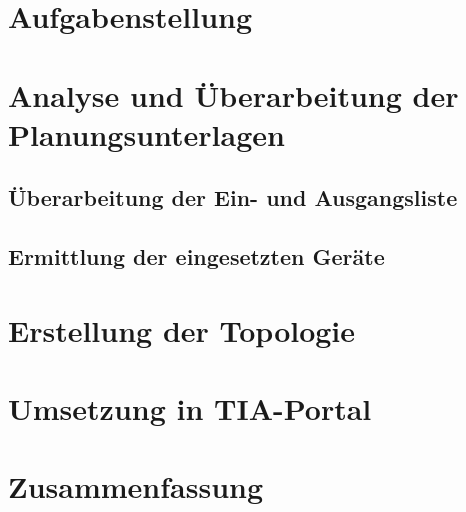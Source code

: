 \chapter{Aufgabenstellung}

\chapter{Analyse und Überarbeitung der Planungsunterlagen}

\section{Überarbeitung der Ein- und Ausgangsliste}

\section{Ermittlung der eingesetzten Geräte}

\chapter{Erstellung der Topologie}

\chapter{Umsetzung in TIA-Portal}

\chapter{Zusammenfassung}



